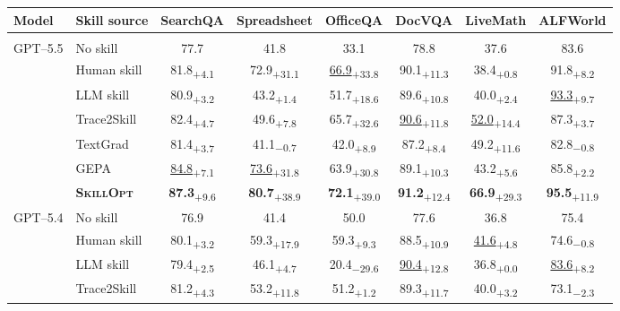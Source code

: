 \documentclass[
]{article}
\providecommand{\mrowcell}{}
\newcommand{\ourmethod}{\textsc{SkillOpt}\xspace}
\newcommand{\dvalp}[2]{\hphantom{\textsubscript{+#2}}#1\textsubscript{\textcolor{deltapos}{+#2}}}
\newcommand{\dvaln}[2]{\hphantom{\textsubscript{$-$#2}}#1\textsubscript{\textcolor{deltaneg}{$-$#2}}}
\newcommand{\harnessrow}[1]{\rowcolor{black!7}\multicolumn{8}{l}{\textbf{#1}}}
\newcommand{\methodcell}[1]{\cellcolor{blue!8}#1}
\begin{document}
\begin{table}[!htbp]
\centering
\scriptsize
\setlength{\tabcolsep}{1.5pt}
\renewcommand{\arraystretch}{1.0}
\begin{tabular}{l l c c c c c c}
\toprule
\textbf{Model} & \textbf{Skill source} & \textbf{SearchQA} & \textbf{Spreadsheet} & \textbf{OfficeQA} & \textbf{DocVQA} & \textbf{LiveMath} & \textbf{ALFWorld} \\
\midrule
\harnessrow{No harness / direct chat} \\
\multirow{7}{*}{GPT--5.5} & No skill & 77.7 & 41.8 & 33.1 & 78.8 & 37.6 & 83.6 \\
\mrowcell & Human skill & \dvalp{81.8}{4.1} & \dvalp{72.9}{31.1} & \dvalp{\underline{66.9}}{33.8} & \dvalp{90.1}{11.3} & \dvalp{38.4}{0.8} & \dvalp{91.8}{8.2} \\
\mrowcell & LLM skill & \dvalp{80.9}{3.2} & \dvalp{43.2}{1.4} & \dvalp{51.7}{18.6} & \dvalp{89.6}{10.8} & \dvalp{40.0}{2.4} & \dvalp{\underline{93.3}}{9.7} \\
\mrowcell & Trace2Skill & \dvalp{82.4}{4.7} & \dvalp{49.6}{7.8} & \dvalp{65.7}{32.6} & \dvalp{\underline{90.6}}{11.8} & \dvalp{\underline{52.0}}{14.4} & \dvalp{87.3}{3.7} \\
\mrowcell & TextGrad & \dvalp{81.4}{3.7} & \dvaln{41.1}{0.7} & \dvalp{42.0}{8.9} & \dvalp{87.2}{8.4} & \dvalp{49.2}{11.6} & \dvaln{82.8}{0.8} \\
\mrowcell & GEPA & \dvalp{\underline{84.8}}{7.1} & \dvalp{\underline{73.6}}{31.8} & \dvalp{63.9}{30.8} & \dvalp{89.1}{10.3} & \dvalp{43.2}{5.6} & \dvalp{85.8}{2.2} \\
\mrowcell & \methodcell{\textbf{\ourmethod{}}} & \methodcell{\dvalp{\textbf{87.3}}{9.6}} & \methodcell{\dvalp{\textbf{80.7}}{38.9}} & \methodcell{\dvalp{\textbf{72.1}}{39.0}} & \methodcell{\dvalp{\textbf{91.2}}{12.4}} & \methodcell{\dvalp{\textbf{66.9}}{29.3}} & \methodcell{\dvalp{\textbf{95.5}}{11.9}} \\
\cmidrule(lr){1-8}
\multirow{7}{*}{GPT--5.4} & No skill & 76.9 & 41.4 & 50.0 & 77.6 & 36.8 & 75.4 \\
\mrowcell & Human skill & \dvalp{80.1}{3.2} & \dvalp{59.3}{17.9} & \dvalp{59.3}{9.3} & \dvalp{88.5}{10.9} & \dvalp{\underline{41.6}}{4.8} & \dvaln{74.6}{0.8} \\
\mrowcell & LLM skill & \dvalp{79.4}{2.5} & \dvalp{46.1}{4.7} & \dvaln{20.4}{29.6} & \dvalp{\underline{90.4}}{12.8} & \dvalp{36.8}{0.0} & \dvalp{\underline{83.6}}{8.2} \\
\mrowcell & Trace2Skill & \dvalp{81.2}{4.3} & \dvalp{53.2}{11.8} & \dvalp{51.2}{1.2} & \dvalp{89.3}{11.7} & \dvalp{40.0}{3.2} & \dvaln{73.1}{2.3} \\

\end{tabular}
\end{table}
\end{document}
